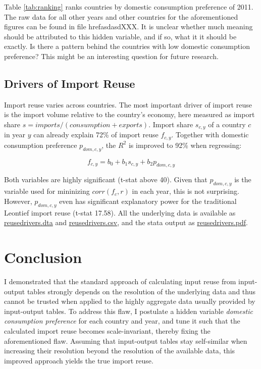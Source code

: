 \documentclass{paper}
\begin{document}
Table \ref{tab:ranking} ranks countries by domestic consumption preference of 2011. The raw data for all other years and other countries for the aforementioned figures can be found in file href{asdasd}{XXX}. It is unclear whether much meaning should be attributed to this hidden variable, and if so, what it it should be exactly. Is there a pattern behind the countries with low domestic consumption preference? This might be an interesting question for future research.

\subsection{Drivers of Import Reuse}
Import reuse varies across countries. The most important driver of import reuse is the import volume relative to the country's economy, here measured as import share $s = imports / (consumption + exports)$. Import share $s_{c,y}$ of a country $c$ in year $y$ can already explain 72\% of import reuse $f_{c,y}$. Together with domestic consumption preference $p_{dom,c,y}$, the $R^2$ is improved to 92\% when regressing:

\[f_{c,y} = b_0 + b_1 s_{c,y} + b_2 p_{dom,c,y}\]

Both variables are highly significant (t-stat above 40). Given that $p_{dom,c,y}$ is the variable used for mininizing $corr(f_c, r)$ in each year, this is not surprising. However, $p_{dom,c,y}$ even has significant explanatory power for the traditional Leontief import reuse (t-stat 17.58). All the underlying data is available as \href{https://github.com/kronrod/importreuse/blob/master/data/reusedrivers.dta}{reusedrivers.dta} and \href{https://github.com/kronrod/importreuse/blob/master/data/reusedrivers.dta}{reusedrivers.csv}, and the stata output as \href{https://github.com/kronrod/importreuse/blob/master/data/reusedrivers.pdf}{reusedrivers.pdf}.

\section{Conclusion}
\label{sec:conclusion}
I demonstrated that the standard approach of calculating input reuse from input-output tables strongly depends on the resolution of the underlying data and thus cannot be trusted when applied to the highly aggregate data usually provided by input-output tables. To address this flaw, I postulate a hidden variable \emph{domestic consumption preference} for each country and year, and tune it such that the calculated import reuse becomes scale-invariant, thereby fixing the aforementioned flaw. Assuming that input-output tables stay self-similar when increasing their resolution beyond the resolution of the available data, this improved approach yields the true import reuse.
\end{document}
